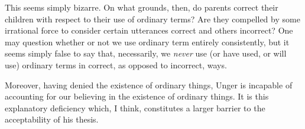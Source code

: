 \documentclass[11pt]{article}
\newenvironment{squote}{%
	\begin{quote}\begin{singlespace}%
	}{%
	\end{singlespace}\end{quote}}
\begin{document}
\begin{spacing}{1.5}
This seems simply bizarre.  On what grounds, then, do parents correct
their children with respect to their use of ordinary terms?  Are they
compelled by some irrational force to consider certain utterances
correct and others incorrect?  One may question whether or not we use
ordinary term entirely consistently, but it seems simply false to say that,
necessarily, we {\em never} use (or have used, or will use) ordinary
terms in correct, as opposed to incorrect, ways.  

\begin{comment}
As we shall see,
color words are susceptible to the sorites paradox as well, but that
should not make us think that we cannot use `red' successfully:

\begin{squote}
It is\,\ldots\,unclear how far our use of e.g. the vocabulary of
colours \emph{is} consistent.  The descriptions given of awkward cases
may vary from occasion to occasion.  Besides that, the notion of using
a predicate consistently would appear to require some objective
criteria for variation in relevant respects among items to be
described in terms of it; but what is distinctive about observational
predicates is exactly the lack of such criteria.  So it would be
unwise to lean too heavily, as though it were a matter of hard fact,
upon the consistency of our employment of colour predicates.  What,
however, may be depended upon is that our use of these predicates is
largely \emph{successful}; the expectations which we form on the basis
of others' ascriptions of colour are not usually disappointed.
Agreement is generally possible about how colours are to be described;
and this, of course, is equivalent to saying that others \emph{seem}
to use colour predicates in a largely consistent way
\citep[361]{wright1975}.
\end{squote}

It is because we do seem to use color and other words in a consistent
way that the sorites paradoxes are troubling.  Unger's conclusion is
that there is no such consistency.  But where do we get this
impression of consistency in the first place?

I am not sure how Unger would reply (though I'll try to think of
something).  
\end{comment}

Moreover, having denied the existence of ordinary things, Unger is
incapable of accounting for our believing in the existence of ordinary
things.  It is this explanatory deficiency which, I think, constitutes
a larger barrier to the acceptability of his thesis.


\end{spacing}
\end{document}
